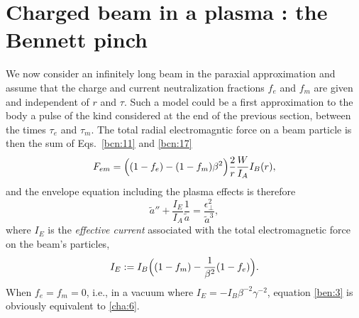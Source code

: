 \documentclass [12pt,a4paper,     ]{report} %
\newcommand{\DEF}{:=}                 %
\begin{document}
\section{Charged beam in a plasma : the Bennett pinch}
\label{ben:0}


   We now consider an infinitely long beam in the paraxial approximation and assume that the charge and current neutralization fractions $f_e$ and $f_m$ are given and independent of $r$ and $\tau$.  Such a model could be a first approximation to the body a pulse of the kind considered at the end of the previous section, between the times $\tau_e$ and $\tau_m$.   The total radial electromagntic force on a beam particle is then the sum of Eqs.~\eqref{bcn:11} and \eqref{bcn:17}
%
\begin{equation}\label{ben:1} %
          F_{em} = \Bigl( (1-f_e) - (1-f_m)\beta^2 \Bigr)
                   \frac{2}{r} \frac{W}{I_A} I_B(r),
\end{equation}
%
and the envelope equation including the plasma effects is therefore \cite{LEE--1976A}
%
\begin{equation}\label{ben:2} %
    \tilde{a}'' + \frac{I_E}{I_A}\frac{1}{\tilde{a}} 
                = \frac{\epsilon_{\perp}^2}{\tilde{a}^3},
\end{equation}
%
where $I_E$ is the \emph{effective current} associated with the total electromagnetic force on the beam's particles,
%
\begin{equation}\label{ben:3} %
   I_E \DEF I_B \Bigl( (1-f_m) -  \frac{1}{\beta^2} (1-f_e) \Bigr).
\end{equation}
%
When $f_e=f_m=0$, i.e., in a vacuum where $I_E = -I_B\beta^{-2}\gamma^{-2}$, equation \eqref{ben:3} is obviously equivalent to \eqref{cha:6}.
\end{document}
